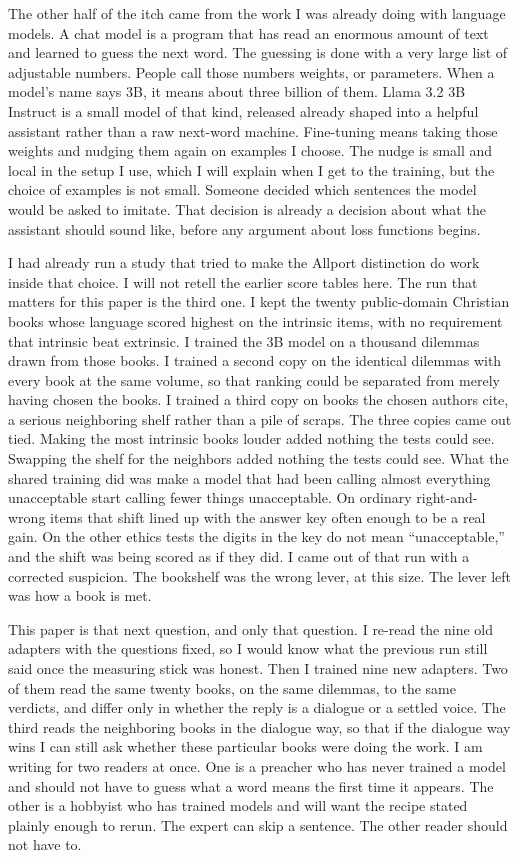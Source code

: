 \documentclass[11pt]{article}
\begin{document}
The other half of the itch came from the work I was already doing with language models. A chat model is a program that has read an enormous amount of text and learned to guess the next word. The guessing is done with a very large list of adjustable numbers. People call those numbers weights, or parameters. When a model's name says 3B, it means about three billion of them. Llama 3.2 3B Instruct is a small model of that kind, released already shaped into a helpful assistant rather than a raw next-word machine. Fine-tuning means taking those weights and nudging them again on examples I choose. The nudge is small and local in the setup I use, which I will explain when I get to the training, but the choice of examples is not small. Someone decided which sentences the model would be asked to imitate. That decision is already a decision about what the assistant should sound like, before any argument about loss functions begins.

I had already run a study that tried to make the Allport distinction do work inside that choice. I will not retell the earlier score tables here. The run that matters for this paper is the third one. I kept the twenty public-domain Christian books whose language scored highest on the intrinsic items, with no requirement that intrinsic beat extrinsic. I trained the 3B model on a thousand dilemmas drawn from those books. I trained a second copy on the identical dilemmas with every book at the same volume, so that ranking could be separated from merely having chosen the books. I trained a third copy on books the chosen authors cite, a serious neighboring shelf rather than a pile of scraps. The three copies came out tied. Making the most intrinsic books louder added nothing the tests could see. Swapping the shelf for the neighbors added nothing the tests could see. What the shared training did was make a model that had been calling almost everything unacceptable start calling fewer things unacceptable. On ordinary right-and-wrong items that shift lined up with the answer key often enough to be a real gain. On the other ethics tests the digits in the key do not mean ``unacceptable,'' and the shift was being scored as if they did. I came out of that run with a corrected suspicion. The bookshelf was the wrong lever, at this size. The lever left was how a book is met.

This paper is that next question, and only that question. I re-read the nine old adapters with the questions fixed, so I would know what the previous run still said once the measuring stick was honest. Then I trained nine new adapters. Two of them read the same twenty books, on the same dilemmas, to the same verdicts, and differ only in whether the reply is a dialogue or a settled voice. The third reads the neighboring books in the dialogue way, so that if the dialogue way wins I can still ask whether these particular books were doing the work. I am writing for two readers at once. One is a preacher who has never trained a model and should not have to guess what a word means the first time it appears. The other is a hobbyist who has trained models and will want the recipe stated plainly enough to rerun. The expert can skip a sentence. The other reader should not have to.
\end{document}
